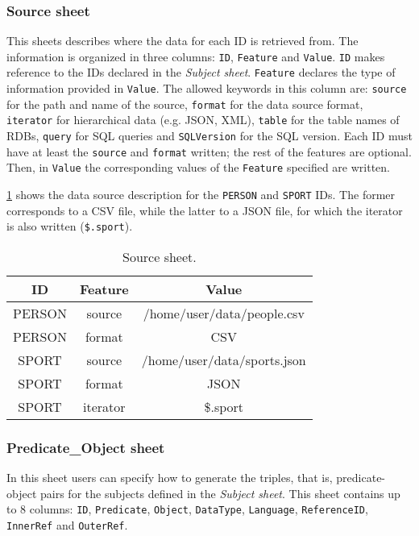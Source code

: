 
\subsubsection{Source sheet} 

This sheets describes where the data for each ID is retrieved from. The information is organized in three columns: \texttt{ID}, \texttt{Feature} and \texttt{Value}. 
\texttt{ID} makes reference to the IDs declared in the \textit{Subject sheet}. 
\texttt{Feature} declares the type of information provided in \texttt{Value}. The allowed keywords in this column are: \texttt{source} for the path and name of the source, \texttt{format} for the data source format, \texttt{iterator} for hierarchical data (e.g. JSON, XML), \texttt{table} for the table names of RDBs, \texttt{query} for SQL queries and \texttt{SQLVersion} for the SQL version. Each ID must have at least the \texttt{source} and \texttt{format} written; the rest of the features are optional. 
Then, in \texttt{Value} the corresponding values of the \texttt{Feature} specified are written. 

\cref{tab:source_sheet} shows the data source description for the \texttt{PERSON} and \texttt{SPORT} IDs. The former corresponds to a CSV file, while the latter to a JSON file, for which the iterator is also written (\texttt{\$.sport}). 

\begin{table}[h!]
\caption{Source sheet.}
\label{tab:source_sheet}
\centering
\begin{tabular}{c|c|c}
\midrule
\textbf{ID} & \textbf{Feature} & \textbf{Value}              \\ \midrule
PERSON    & source          & /home/user/data/people.csv  \\
PERSON    & format          & CSV                         \\
SPORT     & source          & /home/user/data/sports.json \\
SPORT     & format          & JSON                        \\  
SPORT     & iterator        & \$.sport                    \\ \midrule
\end{tabular}
\end{table}

\subsubsection{Predicate\_Object sheet} In this sheet users can specify how to generate the triples, that is, predicate-object pairs for the subjects defined in the \textit{Subject sheet}. This sheet contains up to 8 columns: \texttt{ID}, \texttt{Predicate}, \texttt{Object}, \texttt{DataType}, \texttt{Language}, \texttt{ReferenceID}, \texttt{InnerRef} and \texttt{OuterRef}.

